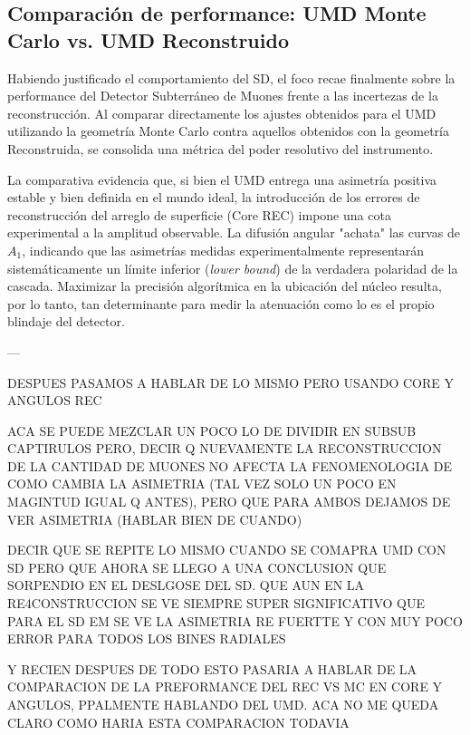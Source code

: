 \subsection{Comparación de performance: UMD Monte Carlo vs. UMD Reconstruido}
\label{subsec:comparacion_performance_umd}

Habiendo justificado el comportamiento del SD, el foco recae finalmente sobre la performance del Detector Subterráneo de Muones frente a las incertezas de la reconstrucción. Al comparar directamente los ajustes obtenidos para el UMD utilizando la geometría Monte Carlo contra aquellos obtenidos con la geometría Reconstruida, se consolida una métrica del poder resolutivo del instrumento.

La comparativa evidencia que, si bien el UMD entrega una asimetría positiva estable y bien definida en el mundo ideal, la introducción de los errores de reconstrucción del arreglo de superficie (Core REC) impone una cota experimental a la amplitud observable. La difusión angular "achata" las curvas de $A_1$, indicando que las asimetrías medidas experimentalmente representarán sistemáticamente un límite inferior (\textit{lower bound}) de la verdadera polaridad de la cascada. Maximizar la precisión algorítmica en la ubicación del núcleo resulta, por lo tanto, tan determinante para medir la atenuación como lo es el propio blindaje del detector.


---


DESPUES PASAMOS A HABLAR DE LO MISMO PERO USANDO CORE Y ANGULOS REC

ACA SE PUEDE MEZCLAR UN POCO LO DE DIVIDIR EN SUBSUB CAPTIRULOS PERO, DECIR Q NUEVAMENTE LA RECONSTRUCCION DE LA CANTIDAD DE MUONES NO AFECTA LA FENOMENOLOGIA DE COMO CAMBIA LA ASIMETRIA (TAL VEZ SOLO UN POCO EN MAGINTUD IGUAL Q ANTES), PERO QUE PARA AMBOS DEJAMOS DE VER ASIMETRIA (HABLAR BIEN DE CUANDO)

DECIR QUE SE REPITE LO MISMO CUANDO SE COMAPRA UMD CON SD PERO QUE AHORA SE LLEGO A UNA CONCLUSION QUE SORPENDIO EN EL DESLGOSE DEL SD. QUE AUN EN LA RE4CONSTRUCCION SE VE SIEMPRE SUPER SIGNIFICATIVO QUE PARA EL SD EM SE VE LA ASIMETRIA RE FUERTTE Y CON MUY POCO ERROR PARA TODOS LOS BINES RADIALES



Y RECIEN DESPUES DE TODO ESTO PASARIA A HABLAR DE LA COMPARACION DE LA PREFORMANCE DEL REC VS MC EN CORE Y ANGULOS, PPALMENTE HABLANDO DEL UMD. ACA NO ME QUEDA CLARO COMO HARIA ESTA COMPARACION TODAVIA

